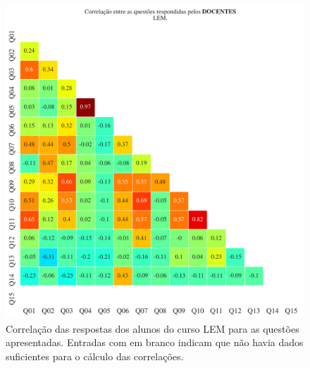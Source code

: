 \documentclass[a4paper,10pt]{article}
\begin{document}
\begin{figure}[h]
\centering
\includegraphics[width=0.999\linewidth]{matriz_corr__LEM_docentes.png}
\caption{\label{fig:corr_docentes}Correlação das respostas dos alunos do curso LEM para as questões apresentadas. Entradas com em branco indicam que não havia dados suficientes para o cálculo das correlações.}
\end{figure}
\end{document}
